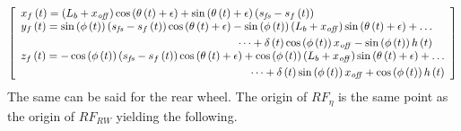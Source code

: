 \begin{equation}
    \left[ \begin {array}{l} 
        x_{f} \left( t \right) = \left( L_{b}+x_{{
        \it off}} \right) \cos \left( \theta \left( t \right) +\epsilon
         \right) +\sin \left( \theta \left( t \right) +\epsilon \right) 
         \left( s_{{\it fs}}-s_{f} \left( t \right)  \right) \\ 
         \begin{split}
         y_{f} \left( t \right) =\sin \left( \phi \left( t
         \right)  \right)  \left( s_{{\it fs}}-s_{f} \left( t \right) 
         \right) \cos \left( \theta \left( t \right) +\epsilon \right) -\sin
         \left( \phi \left( t \right)  \right)  \left( L_{b}+x_{{\it off}}
         \right) \sin \left( \theta \left( t \right) +\epsilon \right) + \dots 
         \\ \dots +\delta
         \left( t \right) \cos \left( \phi \left( t \right)  \right) x_{{\it 
        off}}-\sin \left( \phi \left( t \right)  \right) h \left( t \right) 
        \end{split} \\ 
        \begin{split}
        z_{f} \left( t \right) =-\cos \left( \phi \left( 
        t \right)  \right)  \left( s_{{\it fs}}-s_{f} \left( t \right) 
         \right) \cos \left( \theta \left( t \right) +\epsilon \right) +\cos
         \left( \phi \left( t \right)  \right)  \left( L_{b}+x_{{\it off}}
         \right) \sin \left( \theta \left( t \right) +\epsilon \right) + \dots
         \\ \dots +\delta
         \left( t \right) \sin \left( \phi \left( t \right)  \right) x_{{\it 
        off}}+\cos \left( \phi \left( t \right)  \right) h \left( t \right) 
        \end{split}
    \end {array} \right]         
\end{equation}
\normalsize
%
The same can be said for the rear wheel. The origin of $RF_{\eta}$ is the same point as the origin of $RF_{RW}$ yielding the following.
%
\footnotesize
